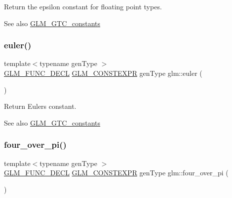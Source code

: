 Return the epsilon constant for floating point types. \begin{DoxySeeAlso}{See also}
\mbox{\hyperlink{group__gtc__constants}{G\+L\+M\+\_\+\+G\+T\+C\+\_\+constants}} 
\end{DoxySeeAlso}
\mbox{\label{group__gtc__constants_gad8fe2e6f90bce9d829e9723b649fbd42}} 
\subsubsection{\texorpdfstring{euler()}{euler()}}
{\footnotesize\ttfamily template$<$typename gen\+Type $>$ \\
\mbox{\hyperlink{setup_8hpp_ab2d052de21a70539923e9bcbf6e83a51}{G\+L\+M\+\_\+\+F\+U\+N\+C\+\_\+\+D\+E\+CL}} \mbox{\hyperlink{setup_8hpp_a08b807947b47031d3a511f03f89645ad}{G\+L\+M\+\_\+\+C\+O\+N\+S\+T\+E\+X\+PR}} gen\+Type glm\+::euler (\begin{DoxyParamCaption}{ }\end{DoxyParamCaption})}

Return Euler\textquotesingle{}s constant. \begin{DoxySeeAlso}{See also}
\mbox{\hyperlink{group__gtc__constants}{G\+L\+M\+\_\+\+G\+T\+C\+\_\+constants}} 
\end{DoxySeeAlso}
\mbox{\label{group__gtc__constants_ga753950e5140e4ea6a88e4a18ba61dc09}} 
\subsubsection{\texorpdfstring{four\+\_\+over\+\_\+pi()}{four\_over\_pi()}}
{\footnotesize\ttfamily template$<$typename gen\+Type $>$ \\
\mbox{\hyperlink{setup_8hpp_ab2d052de21a70539923e9bcbf6e83a51}{G\+L\+M\+\_\+\+F\+U\+N\+C\+\_\+\+D\+E\+CL}} \mbox{\hyperlink{setup_8hpp_a08b807947b47031d3a511f03f89645ad}{G\+L\+M\+\_\+\+C\+O\+N\+S\+T\+E\+X\+PR}} gen\+Type glm\+::four\+\_\+over\+\_\+pi (\begin{DoxyParamCaption}{ }\end{DoxyParamCaption})}

